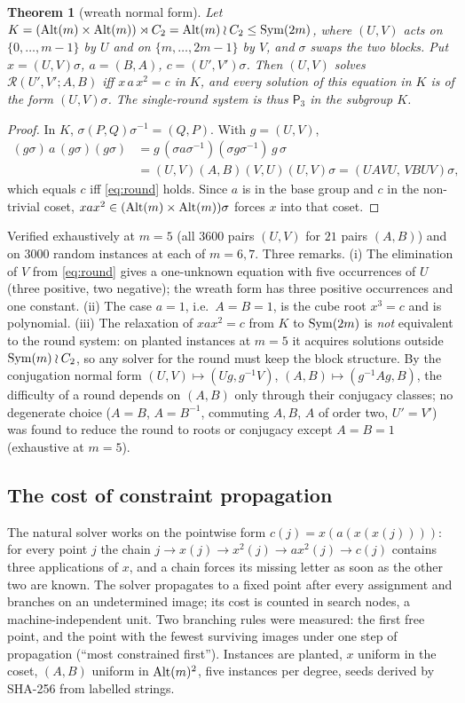 \documentclass[preprint,12pt]{elsarticle}
\newtheorem{thm}{Theorem}[section]\newtheorem{lem}[thm]{Lemma}\newtheorem{cor}[thm]{Corollary}\newtheorem{prop}[thm]{Proposition}
\theoremstyle{definition}\newtheorem{defi}[thm]{Definition}\newtheorem{prob}[thm]{Problem}\newtheorem{obs}[thm]{Observation}
\theoremstyle{remark}\newtheorem{rem}[thm]{Remark}
\newcommand{\Pthree}{\mathsf{P}_3}\newcommand{\Conj}[1]{\mathsf{Conj}_{#1}}\newcommand{\Dzero}{\Conj{3}}\newcommand{\TR}{T_{\mathcal R}}
\begin{document}
\begin{thm}[wreath normal form]\label{thm:wreath}
Let $K=(\operatorname{Alt}(m)\times\operatorname{Alt}(m))\rtimes C_2=\operatorname{Alt}(m)\wr C_2\le\operatorname{Sym}(2m)$, where $(U,V)$ acts on $\{0,\ldots,m-1\}$ by $U$ and on $\{m,\ldots,2m-1\}$ by $V$, and $\sigma$ swaps the two blocks. Put $x=(U,V)\sigma$, $a=(B,A)$, $c=(U',V')\sigma$. Then $(U,V)$ solves $\mathcal R(U',V';A,B)$ iff $x\,a\,x^{2}=c$ in $K$, and every solution of this equation in $K$ is of the form $(U,V)\sigma$. The single-round system is thus $\Pthree$ in the subgroup $K$.
\end{thm}
\begin{proof}
In $K$, $\sigma(P,Q)\sigma^{-1}=(Q,P)$. With $g=(U,V)$,
\begin{align*}(g\sigma)\,a\,(g\sigma)(g\sigma)&=g\,(\sigma a\sigma^{-1})(\sigma g\sigma^{-1})\,g\,\sigma\\&=(U,V)(A,B)(V,U)(U,V)\sigma=(UAVU,\,VBUV)\sigma,\end{align*}
which equals $c$ iff \eqref{eq:round} holds. Since $a$ is in the base group and $c$ in the non-trivial coset, $xax^{2}\in(\operatorname{Alt}(m)\times\operatorname{Alt}(m))\sigma$ forces $x$ into that coset.
\end{proof}
Verified exhaustively at $m=5$ (all $3600$ pairs $(U,V)$ for $21$ pairs $(A,B)$) and on $3000$ random instances at each of $m=6,7$. Three remarks. (i) The elimination of $V$ from \eqref{eq:round} gives a one-unknown equation with five occurrences of $U$ (three positive, two negative); the wreath form has three positive occurrences and one constant. (ii) The case $a=1$, i.e.\ $A=B=1$, is the cube root $x^{3}=c$ and is polynomial. (iii) The relaxation of $xax^{2}=c$ from $K$ to $\operatorname{Sym}(2m)$ is \emph{not} equivalent to the round system: on planted instances at $m=5$ it acquires solutions outside $\operatorname{Sym}(m)\wr C_2$, so any solver for the round must keep the block structure. By the conjugation normal form $(U,V)\mapsto(Ug,g^{-1}V)$, $(A,B)\mapsto(g^{-1}Ag,B)$, the difficulty of a round depends on $(A,B)$ only through their conjugacy classes; no degenerate choice ($A=B$, $A=B^{-1}$, commuting $A,B$, $A$ of order two, $U'=V'$) was found to reduce the round to roots or conjugacy except $A=B=1$ (exhaustive at $m=5$).

\subsection{The cost of constraint propagation}

The natural solver works on the pointwise form $c(j)=x(a(x(x(j))))$: for every point $j$ the chain $j\to x(j)\to x^{2}(j)\to a x^{2}(j)\to c(j)$ contains three applications of $x$, and a chain forces its missing letter as soon as the other two are known. The solver propagates to a fixed point after every assignment and branches on an undetermined image; its cost is counted in search nodes, a machine-independent unit. Two branching rules were measured: the first free point, and the point with the fewest surviving images under one step of propagation (``most constrained first''). Instances are planted, $x$ uniform in the coset, $(A,B)$ uniform in $\operatorname{Alt}(m)^{2}$, five instances per degree, seeds derived by SHA-256 from labelled strings.
\end{document}
